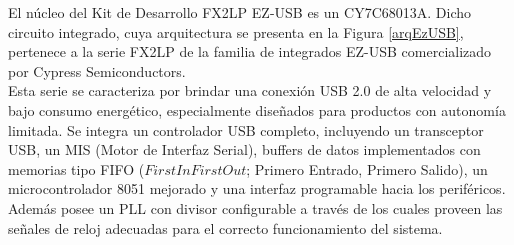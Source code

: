 El núcleo del Kit de Desarrollo FX2LP EZ-USB es un CY7C68013A. Dicho circuito integrado, cuya arquitectura se presenta en la Figura \ref{arqEzUSB}, pertenece a la serie FX2LP de la familia de integrados EZ-USB comercializado por Cypress Semiconductors.\\

Esta serie se caracteriza por brindar una conexión USB 2.0 de alta velocidad y bajo consumo energético, especialmente diseñados para productos con autonomía limitada. Se integra un controlador USB completo, incluyendo un transceptor USB, un MIS (Motor de Interfaz Serial), buffers de datos implementados con memorias tipo FIFO (\(First In First Out\); Primero Entrado, Primero Salido), un microcontrolador 8051 mejorado y una interfaz programable hacia los periféricos. Además posee un PLL con divisor configurable a través de los cuales proveen las señales de reloj adecuadas para el correcto funcionamiento del sistema.\\


